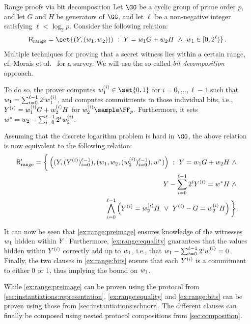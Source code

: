\documentclass[11pt]{article}
\begin{document}
\begin{example}{Range proofs via bit decomposition}{}
  Let $\GG$ be a cyclic group of prime order $p$, and let $G$ and $H$ be generators of $\GG$, and let $\ell$ be a non-negative integer satisfying $\ell<\log_2 p$.
	Consider the following relation:
  $$
	  \rangerelation = \set{\left(\statement,(\witness_1,\witness_2))\right)~:~\statement=\witness_1 G +\witness_2 H ~\land~ \witness_1\in[0,2^\ell)}\,.
	$$
	Multiple techniques for proving that a secret witness lies within a certain range, cf. Morais et al.~\cite{range-proof-survey} for a survey.
	We will use the so-called \emph{bit decomposition} approach.

	To do so, the prover computes $\witness_1^{(i)}\in\set{0,1}$ for $i=0,\dots,\ell-1$ such that $w_1=\sum_{i=0}^{\ell-1}2^iw_1^{(i)}$, and computes commitments to those individual bits, i.e., $Y^{(i)}=w_1^{(i)}G+w_2^{(i)}H$ for $\witness_2^{(i)}\sample\FF_p$.
	Furthermore, it sets $w^*=w_2-\sum_{i=0}^{\ell-1}2^iw_2^{(i)}$.

  Assuming that the discrete logarithm problem is hard in $\GG$, the above relation is now equivalent to the following relation:
  \begin{align}
	  \mathsf{R}_{\operatorname{range}}' = \bigg\{\left((Y,(Y^{(i)})_{i=0}^{\ell-1}),(w_1,w_2,(w_2^{(i)})_{i=0}^{\ell-1}),w^*)\right)~:~ 		Y=w_1 G +w_2 H ~\land~ \label{ex:range:preimage}\\
		Y-\sum_{i=0}^{\ell-1} 2^iY^{(i)} = w^* H ~\land~  \label{ex:range:equality}\\
		\bigwedge_{i=0}^{\ell-1} \left(Y^{(i)}=w_2^{(i)}H ~\lor~ Y^{(i)}-G=w_2^{(i)}H\right)\bigg\}\,.\label{ex:range:bits}
	\end{align}

	It can now be seen that \cref{ex:range:preimage} ensures knowledge of the witnesses $w_1$ hidden within $Y$.
	Furthermore, \cref{ex:range:equality} guarantees that the values hidden within $Y^{(i)}$ correctly add up to $w_1$, i.e., that $w_1-\sum_{i=0}^{\ell-1}2^iw_1^{(i)}=0$.
  Finally, the two clauses in \cref{ex:range:bits} ensure that each $Y^{(i)}$ is a commitment to either $0$ or $1$, thus implying the bound on $w_1$.

	While \cref{ex:range:preimage} can be proven using the protocol from \cref{sec:instantiations:representation}, \cref{ex:range:equality} and \cref{ex:range:bits} can be proven using those from \cref{sec:instantiations:schnorr}.
	The different clauses can finally be composed using nested protocol compositions from \cref{sec:composition}.
\end{example}
\end{document}
